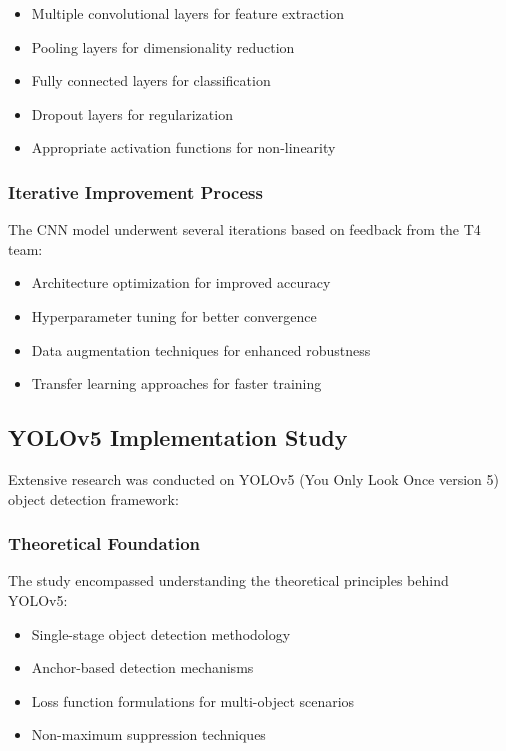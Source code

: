 \documentclass{book}
\begin{document}
\begin{itemize}
\item Multiple convolutional layers for feature extraction
\item Pooling layers for dimensionality reduction
\item Fully connected layers for classification
\item Dropout layers for regularization
\item Appropriate activation functions for non-linearity
\end{itemize}

\subsubsection{Iterative Improvement Process}
\par\noindent The CNN model underwent several iterations based on feedback from the T4 team:

\begin{itemize}
\item Architecture optimization for improved accuracy
\item Hyperparameter tuning for better convergence
\item Data augmentation techniques for enhanced robustness
\item Transfer learning approaches for faster training
\end{itemize}

\subsection{YOLOv5 Implementation Study}
\par\noindent Extensive research was conducted on YOLOv5 (You Only Look Once version 5) object detection framework:

\subsubsection{Theoretical Foundation}
\par\noindent The study encompassed understanding the theoretical principles behind YOLOv5:

\begin{itemize}
\item Single-stage object detection methodology
\item Anchor-based detection mechanisms
\item Loss function formulations for multi-object scenarios
\item Non-maximum suppression techniques
\end{itemize}
\end{document}
